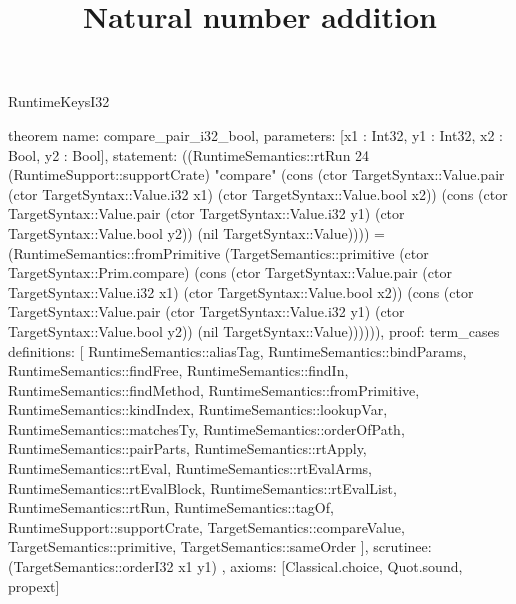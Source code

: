 \begin{lexlean}{RuntimeKeysI32}
\title{Natural number addition}
\begin{semanticmodule}
theorem{
  name: compare_pair_i32_bool,
  parameters: [x1 : Int32, y1 : Int32, x2 : Bool, y2 : Bool],
  statement: ((RuntimeSemantics::rtRun 24 (RuntimeSupport::supportCrate) "compare" (cons (ctor TargetSyntax::Value.pair (ctor TargetSyntax::Value.i32 x1) (ctor TargetSyntax::Value.bool x2)) (cons (ctor TargetSyntax::Value.pair (ctor TargetSyntax::Value.i32 y1) (ctor TargetSyntax::Value.bool y2)) (nil TargetSyntax::Value)))) = (RuntimeSemantics::fromPrimitive (TargetSemantics::primitive (ctor TargetSyntax::Prim.compare) (cons (ctor TargetSyntax::Value.pair (ctor TargetSyntax::Value.i32 x1) (ctor TargetSyntax::Value.bool x2)) (cons (ctor TargetSyntax::Value.pair (ctor TargetSyntax::Value.i32 y1) (ctor TargetSyntax::Value.bool y2)) (nil TargetSyntax::Value)))))),
  proof: term_cases{
    definitions: [
      RuntimeSemantics::aliasTag,
      RuntimeSemantics::bindParams,
      RuntimeSemantics::findFree,
      RuntimeSemantics::findIn,
      RuntimeSemantics::findMethod,
      RuntimeSemantics::fromPrimitive,
      RuntimeSemantics::kindIndex,
      RuntimeSemantics::lookupVar,
      RuntimeSemantics::matchesTy,
      RuntimeSemantics::orderOfPath,
      RuntimeSemantics::pairParts,
      RuntimeSemantics::rtApply,
      RuntimeSemantics::rtEval,
      RuntimeSemantics::rtEvalArms,
      RuntimeSemantics::rtEvalBlock,
      RuntimeSemantics::rtEvalList,
      RuntimeSemantics::rtRun,
      RuntimeSemantics::tagOf,
      RuntimeSupport::supportCrate,
      TargetSemantics::compareValue,
      TargetSemantics::primitive,
      TargetSemantics::sameOrder
    ],
    scrutinee: (TargetSemantics::orderI32 x1 y1)
  },
  axioms: [Classical.choice, Quot.sound, propext]
}


\end{semanticmodule}
\end{lexlean}
